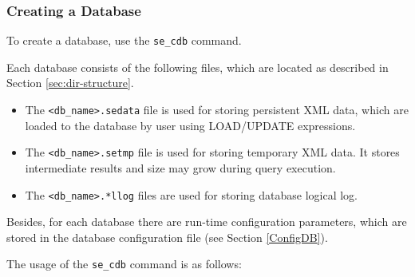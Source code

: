 \documentclass[a4paper,12pt]{article}
\begin{document}
\subsubsection{Creating a Database}
\label{CreateDB}

To create a database, use the \verb!se_cdb! command.

Each database consists of the following files, which are located as described
in Section \ref{sec:dir-structure}.

\begin{itemize}
\item The \verb!<db_name>.sedata! file is used for storing persistent XML data,
which are loaded to the database by user using LOAD/UPDATE expressions.
\item The \verb!<db_name>.setmp! file is used for storing temporary XML data.
It stores intermediate results and size may grow during query execution.
\item The \verb!<db_name>.*llog! files are used for storing database logical
log.
\end{itemize}

Besides, for each database there are run-time configuration parameters, which
are stored in the database configuration file (see Section \ref{ConfigDB}).

The usage of the \verb!se_cdb! command is as follows:
\end{document}
